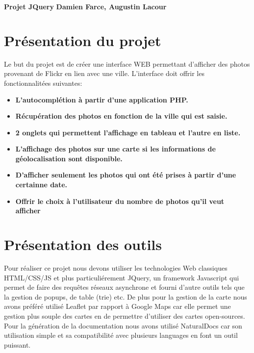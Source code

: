\documentclass[a4paper, 11pt]{article}
\begin{document}
\large\textbf{Projet JQuery}  \textbf{Damien Farce, Augustin Lacour}

\section*{Présentation du projet}
Le but du projet est de créer une interface WEB permettant d'afficher des photos provenant de Flickr en lien avec une ville. L'interface doit offrir les fonctionnalitées suivantes:
\newline
\begin{itemize}
    \item \textbf{L'autocomplétion à partir d'une application PHP.}
    \item \textbf{Récupération des photos en fonction de la ville qui est saisie.}
    \item \textbf{2 onglets qui permettent l'affichage en tableau et l'autre en liste.}
    \item \textbf{L'affichage des photos sur une carte si les informations de géolocalisation sont disponible.}
    \item \textbf{D'afficher seulement les photos qui ont été prises à partir d'une certainne date. }
    \item \textbf{Offrir le choix à l'utilisateur du nombre de photos qu'il veut afficher}
\end{itemize}

\section*{Présentation des outils}
Pour réaliser ce projet nous devons utiliser les technologies Web classiques HTML/CSS/JS et plus particuliérement JQuery, un framework Javascript qui permet de faire des requêtes réseaux asynchrone et fourni d'autre outils tels que la gestion de popups, de table (trie) etc. 
\newline
\newline
De plus pour la gestion de la carte nous avons préféré utilisé Leaflet par rapport à Google Maps car elle permet une gestion plus souple des cartes en de permettre d'utiliser des cartes open-sources.
\newline
\newline
Pour la génération de la documentation nous avons utilisé NaturalDocs car son utilisation simple et sa compatibilité avec plusieurs languages en font un outil puissant. 
\end{document}
